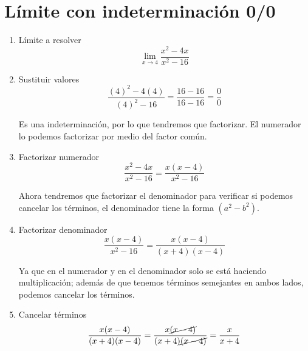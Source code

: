 \documentclass[a4paper,10pt]{article}
\begin{document}
\section{Límite con indeterminación 0/0}
\begin{enumerate}
	\item Límite a resolver
	      $$\lim_{x\to4}\frac{x^{2} - 4x}{x^{2} - 16}$$

	\item Sustituir valores
	      $$\frac{(4)^{2} - 4(4)}{(4)^{2} - 16} = \frac{16 - 16}{16 - 16} = \frac{0}{0}$$

	      Es una indeterminación, por lo que tendremos que factorizar. El numerador lo podemos factorizar por medio del factor común.

	\item Factorizar numerador
	      $$\frac{x^{2} - 4x}{x^{2} - 16} = \frac{x(x - 4)}{x^{2} - 16}$$

	      Ahora tendremos que factorizar el denominador para verificar si podemos cancelar los términos, el denominador tiene la forma $(a^{2} - b^{2})$.

	\item Factorizar denominador
	      $$\frac{x(x - 4)}{x^{2} - 16} = \frac{x(x - 4)}{(x + 4)(x - 4)}$$

	      Ya que en el numerador y en el denominador solo se está haciendo multiplicación; además de que tenemos términos semejantes en ambos lados, podemos cancelar los términos.

	\item Cancelar términos
	      $$\frac{x(x - 4)}{(x + 4)(x - 4)} = \frac{x\cancel{(x - 4)}}{(x + 4)\cancel{(x - 4)}} = \frac{x}{x + 4}$$
\end{enumerate}
\end{document}
